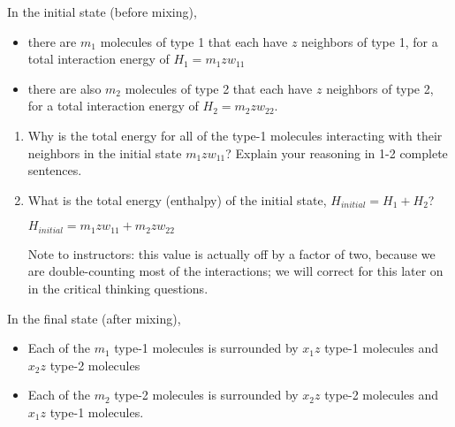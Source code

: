 \begin{activity}
\begin{model}
\begin{enumerate}
\end{enumerate}

\end{model}

\begin{ctqs}

	\question In the initial state (before mixing), 
		\begin{itemize}[itemsep=0pt,topsep=3pt]
			\item there are $m_1$ molecules of type 1 that each have $z$ neighbors of type 1, for a total interaction energy of $H_{1} = m_1 z w_{11}$
			\item there are also $m_2$ molecules of type 2 that each have $z$ neighbors of type 2, for a total interaction energy of $H_{2} = m_2 z w_{22}$.
		\end{itemize}
		
		\begin{enumerate}
			\item Why is the total energy for all of the type-1 molecules interacting with their neighbors in the initial state $m_1 z w_{11}$?  Explain your reasoning in 1-2 complete sentences.
			
				\begin{solution}[1.5in]
				\end{solution}
				
			\item What is the total energy (enthalpy) of the initial state, $H_{initial} = H_1 + H_2$?
		
			\begin{solution}[0.75in]
				$H_{initial} = m_1 z w_{11} + m_2 z w_{22}$
			
				Note to instructors: this value is actually off by a factor of two, because we are double-counting most of the interactions; we will correct for this later on in the critical thinking questions. 
			\end{solution}
			
		\end{enumerate}

	\question In the final state (after mixing),
	
		\begin{itemize}[topsep=3pt,itemsep=0pt]
			\item Each of the $m_1$ type-1 molecules is surrounded by $x_1 z$ type-1 molecules and $x_2 z$ type-2 molecules
			\item Each of the $m_2$ type-2 molecules is surrounded by $x_2 z$ type-2 molecules and $x_1 z$ type-1 molecules.
		\end{itemize}
		

\end{ctqs}
\end{activity}
